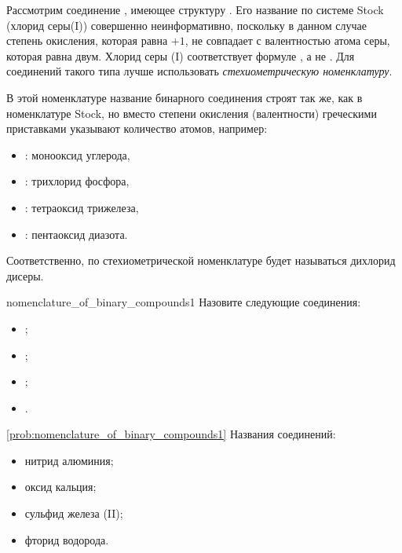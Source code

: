 Рассмотрим соединение , имеющее структуру . Его название по системе Stock (хлорид серы(I)) совершенно неинформативно, поскольку в данном случае степень окисления, которая равна $+1$, не совпадает с валентностью атома серы, которая равна двум. Хлорид серы (I) соответствует формуле , а не . Для соединений такого типа лучше использовать \emph{стехиометрическую номенклатуру}.

В этой номенклатуре название бинарного соединения строят так же, как в номенклатуре Stock, но вместо степени окисления (валентности) греческими приставками указывают количество атомов, например:

\begin{itemize}
    \item {}: монооксид углерода,
    \item {}: трихлорид фосфора,
    \item {}: тетраоксид трижелеза,
    \item {}: пентаоксид диазота.
\end{itemize}

Соответственно,  по стехиометрической номенклатуре будет называться дихлорид дисеры.

\begin{problem}{}{nomenclature_of_binary_compounds1}
    Назовите следующие соединения:
    \begin{itemize}
        \item {};
        \item {};
        \item {};
        \item {}.
    \end{itemize}
    \begin{sol}{\ref{prob:nomenclature_of_binary_compounds1}}
        Названия соединений:
        \begin{itemize}
            \item нитрид алюминия;
            \item оксид кальция;
            \item сульфид железа (II);
            \item фторид водорода.
        \end{itemize}
    \end{sol}
\end{problem}

